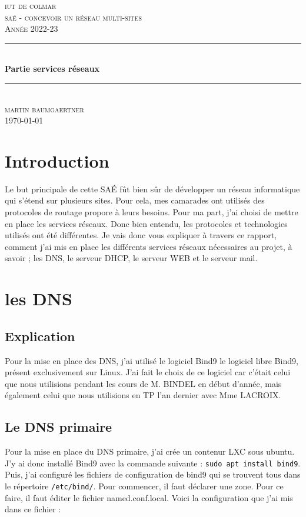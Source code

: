 \documentclass[12pt, a4paper]{article}
\begin{document}
\begin{titlepage}
	\newcommand{\HRule}{\rule{\linewidth}{0.5mm}} 
	\center 
	\textsc{\LARGE iut de colmar}\\[6.5cm] 
	\textsc{\Large saé - concevoir un réseau multi-sites}\\[0.5cm] 
	\textsc{\large Année 2022-23}\\[0.5cm]
	\HRule\\[0.75cm]
	{\huge\bfseries Partie services réseaux}\\[0.4cm]
	\HRule\\[1.5cm]
	\textsc{\large martin baumgaertner}\\[6.5cm] 

	\vfill\vfill\vfill
	{\large\today} 
	\vfill
\end{titlepage}
\newpage
\tableofcontents
\newpage
\section{Introduction}
Le but principale de cette SAÉ fût bien sûr de développer un réseau informatique
qui s'étend sur plusieurs sites. Pour cela, mes camarades ont utilisés des protocoles
de routage propore à leurs besoins. Pour ma part, j'ai choisi de mettre en place
les services réseaux. Donc bien entendu, les protocoles et technologies utilisés
ont été différentes. Je vais donc vous expliquer à travers ce rapport, comment
j'ai mis en place les différents services réseaux nécessaires au projet,
à savoir ; les DNS, le serveur DHCP, le serveur WEB et le serveur mail.


\section{les DNS}
    \subsection{Explication}
    Pour la mise en place des DNS, j'ai utilisé le logiciel Bind9 
    le logiciel libre Bind9, présent exclusivement sur Linux. J'ai fait 
    le choix de ce logiciel car c'était celui que nous utilisions pendant
    les cours de M. BINDEL en début d'année, mais également celui que nous 
    utilisions en TP l'an dernier avec Mme LACROIX. 


    \subsection{Le DNS primaire}
    Pour la mise en place du DNS primaire, j'ai crée un contenur LXC sous
    ubuntu. J'y ai donc installé Bind9 avec la commande suivante : 
    \texttt{sudo apt install bind9}. Puis, j'ai configuré les fichiers
    de configuration de bind9 qui se trouvent tous dans le répertoire 
    \texttt{/etc/bind/}. Pour commencer, il faut déclarer une zone. 
    Pour ce faire, il faut éditer le fichier named.conf.local. Voici la
    configuration que j'ai mis dans ce fichier :
\end{document}
